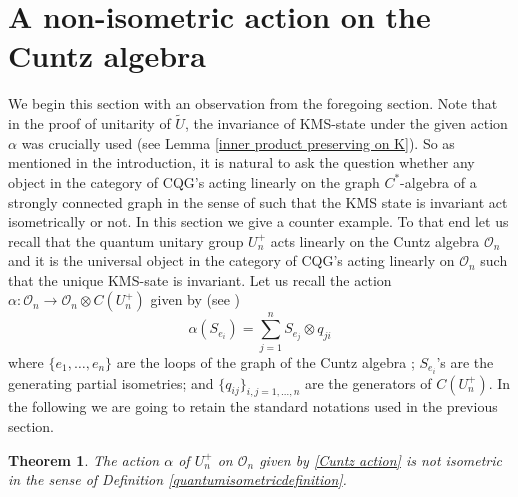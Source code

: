 \documentclass{amsart}
\theoremstyle{plain}
\newtheorem{theorem}[subsection]{Theorem}
\theoremstyle{definition}
\theoremstyle{remark}
\numberwithin{equation}{section}
\newcommand{\cal}{\mathcal}
\newcommand{\clo}{{\cal O}}
\newcommand{\raro}{\rightarrow}
\begin{document}
\section{A non-isometric action on the Cuntz algebra}
We begin this section with an observation from the foregoing section. Note that in the proof of unitarity of $\widetilde{U}$, the invariance of KMS-state under the given action $\alpha$ was crucially used (see Lemma \ref{inner product preserving on K}). So as mentioned in the introduction, it is natural to ask the question whether any object in the category of CQG's acting linearly on the graph $C^{\ast}$-algebra of a strongly connected graph in the sense of \cite{joardar1} such that the KMS state is invariant act isometrically or not. In this section we give a counter example. To that end let us recall that the quantum unitary group $U_{n}^{+}$ acts linearly on the Cuntz algebra $\clo_{n}$ and it is the universal object in the category of CQG's acting linearly on $\clo_{n}$ such that the unique KMS-sate is invariant. Let us recall the action $\alpha:\clo_{n}\raro\clo_{n}\otimes C(U_{n}^{+})$ given by (see \cite{joardar1})
\begin{equation}
    \label{Cuntz action}
    \alpha(S_{e_{i}})=\sum_{j=1}^{n}S_{e_{j}}\otimes q_{ji} 
\end{equation}
where $\{e_{1},\ldots,e_{n}\}$ are the loops of the graph of the Cuntz algebra ; $S_{e_{i}}$'s are the generating partial isometries; and $\{q_{ij}\}_{i,j=1,\ldots,n}$ are the generators of $C(U_{n}^{+})$. In the following we are going to retain the standard notations used in the previous section.
\begin{theorem}
    The action $\alpha$ of $U_{n}^{+}$ on $\clo_{n}$ given by \ref{Cuntz action} is not isometric in the sense of Definition \ref{quantumisometricdefinition}.
\end{theorem}
\end{document}
